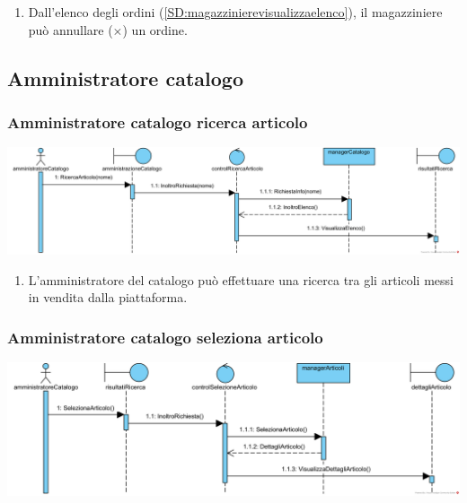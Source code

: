 \documentclass[12pt,a4paper]{article}
\begin{document}
\begin{enumerate}
\item Dall'elenco degli ordini (\ref{SD:magazzinierevisualizzaelenco}), il magazziniere può annullare ($\times$) un ordine.
\end{enumerate}

\newpage

\subsection{Amministratore catalogo}

\subsubsection{Amministratore catalogo ricerca articolo}
\label{SD:amcatvisualizzaelenco}
\begin{center}
\includegraphics[width=\textwidth]{SequenceDiagram/AmministratoreCatalogoVenditaRicerca}
\end{center}

\begin{enumerate}
\item L'amministratore del catalogo può effettuare una ricerca tra gli articoli messi in vendita dalla piattaforma.
\end{enumerate}

\subsubsection{Amministratore catalogo seleziona articolo}
\label{SD:amcatselezionaarticolo}
\begin{center}
\includegraphics[width=\textwidth]{SequenceDiagram/AmministratoreCatalogoVenditaSeleziona}
\end{center}
\end{document}
